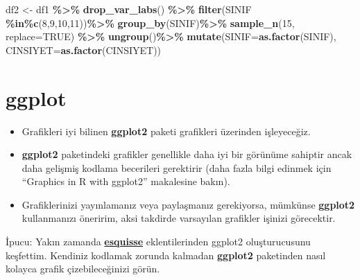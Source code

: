 \documentclass[
  oneside]{book}
\newenvironment{Shaded}{\begin{snugshade}}{\end{snugshade}}
\newcommand{\AttributeTok}[1]{\textcolor[rgb]{0.13,0.29,0.53}{#1}}
\newcommand{\ConstantTok}[1]{\textcolor[rgb]{0.56,0.35,0.01}{#1}}
\newcommand{\DecValTok}[1]{\textcolor[rgb]{0.00,0.00,0.81}{#1}}
\newcommand{\FunctionTok}[1]{\textcolor[rgb]{0.13,0.29,0.53}{\textbf{#1}}}
\newcommand{\NormalTok}[1]{#1}
\newcommand{\OtherTok}[1]{\textcolor[rgb]{0.56,0.35,0.01}{#1}}
\newcommand{\SpecialCharTok}[1]{\textcolor[rgb]{0.81,0.36,0.00}{\textbf{#1}}}
\begin{document}
\begin{Shaded}
\begin{Highlighting}[]
\NormalTok{df2 }\OtherTok{\textless{}{-}}\NormalTok{ df1 }\SpecialCharTok{\%\textgreater{}\%} 
  \FunctionTok{drop\_var\_labs}\NormalTok{() }\SpecialCharTok{\%\textgreater{}\%} 
  \FunctionTok{filter}\NormalTok{(SINIF }\SpecialCharTok{\%in\%}\FunctionTok{c}\NormalTok{(}\DecValTok{8}\NormalTok{,}\DecValTok{9}\NormalTok{,}\DecValTok{10}\NormalTok{,}\DecValTok{11}\NormalTok{))}\SpecialCharTok{\%\textgreater{}\%} 
  \FunctionTok{group\_by}\NormalTok{(SINIF)}\SpecialCharTok{\%\textgreater{}\%}
  \FunctionTok{sample\_n}\NormalTok{(}\DecValTok{15}\NormalTok{, }\AttributeTok{replace=}\ConstantTok{TRUE}\NormalTok{) }\SpecialCharTok{\%\textgreater{}\%}
    \FunctionTok{ungroup}\NormalTok{()}\SpecialCharTok{\%\textgreater{}\%}  
  \FunctionTok{mutate}\NormalTok{(}\AttributeTok{SINIF=}\FunctionTok{as.factor}\NormalTok{(SINIF), }\AttributeTok{CINSIYET=}\FunctionTok{as.factor}\NormalTok{(CINSIYET)) }
\end{Highlighting}
\end{Shaded}

\hypertarget{ggplot}{%
\section{ggplot}\label{ggplot}}

\begin{itemize}
\item
  Grafikleri iyi bilinen \textbf{ggplot2} paketi grafikleri üzerinden işleyeceğiz.
\item
  \textbf{ggplot2} paketindeki grafikler genellikle daha iyi bir görünüme sahiptir ancak daha gelişmiş kodlama becerileri gerektirir (daha fazla bilgi edinmek için ``Graphics in R with ggplot2'' makalesine bakın).
\item
  Grafiklerinizi yayınlamanız veya paylaşmanız gerekiyorsa, mümkünse \textbf{ggplot2} kullanmanızı öneririm, aksi takdirde varsayılan grafikler işinizi görecektir.
\end{itemize}

\begin{info}
İpucu: Yakın zamanda \href{https://dreamrs.github.io/esquisse/index.html}{\textbf{esquisse}} eklentilerinden ggplot2 oluşturucusunu keşfettim. Kendiniz kodlamak zorunda kalmadan \textbf{ggplot2} paketinden nasıl kolayca grafik çizebileceğinizi görün.

\end{info}
\end{document}
